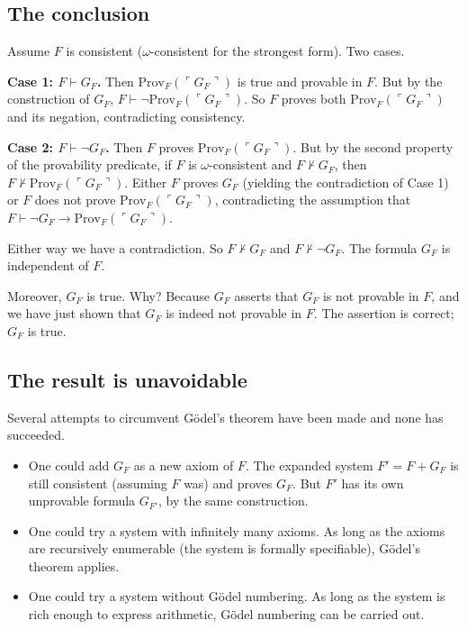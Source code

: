 \subsection{The conclusion}

Assume $F$ is consistent ($\omega$-consistent for the strongest
form). Two cases.

\textbf{Case 1: $F \vdash G_F$.} Then $\text{Prov}_F(\ulcorner G_F \urcorner)$
is true and provable in $F$. But by the construction of $G_F$,
$F \vdash \neg \text{Prov}_F(\ulcorner G_F \urcorner)$. So $F$ proves
both $\text{Prov}_F(\ulcorner G_F \urcorner)$ and its negation,
contradicting consistency.

\textbf{Case 2: $F \vdash \neg G_F$.} Then $F$ proves
$\text{Prov}_F(\ulcorner G_F \urcorner)$. But by the second
property of the provability predicate, if $F$ is $\omega$-consistent
and $F \nvdash G_F$, then $F \nvdash \text{Prov}_F(\ulcorner G_F \urcorner)$.
Either $F$ proves $G_F$ (yielding the contradiction of Case 1) or
$F$ does not prove $\text{Prov}_F(\ulcorner G_F \urcorner)$, contradicting
the assumption that $F \vdash \neg G_F \to \text{Prov}_F(\ulcorner G_F \urcorner)$.

Either way we have a contradiction. So $F \nvdash G_F$ and $F \nvdash
\neg G_F$. The formula $G_F$ is independent of $F$.

Moreover, $G_F$ is true. Why? Because $G_F$ asserts that $G_F$ is
not provable in $F$, and we have just shown that $G_F$ is indeed
not provable in $F$. The assertion is correct; $G_F$ is true.

\subsection{The result is unavoidable}

Several attempts to circumvent G\"odel's theorem have been made and
none has succeeded.

\begin{itemize}[leftmargin=2em]
    \item One could add $G_F$ as a new axiom of $F$. The expanded
    system $F' = F + G_F$ is still consistent (assuming $F$ was) and
    proves $G_F$. But $F'$ has its own unprovable formula $G_{F'}$,
    by the same construction.
    \item One could try a system with infinitely many axioms. As
    long as the axioms are recursively enumerable (the system is
    formally specifiable), G\"odel's theorem applies.
    \item One could try a system without G\"odel numbering. As long
    as the system is rich enough to express arithmetic, G\"odel
    numbering can be carried out.
\end{itemize}

